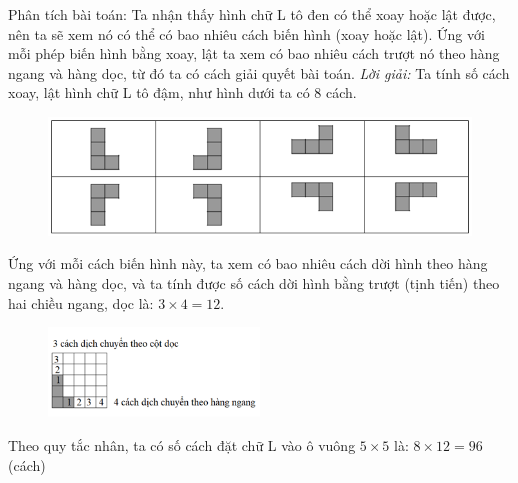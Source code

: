 \begin{multicols}{2}
\begin{multicols}{2}
\begin{figure}[H]
			\vspace*{-5pt}
		\end{figure}
	\end{multicols}
	Phân tích bài toán: Ta nhận thấy hình chữ L tô đen có thể xoay hoặc lật được, nên ta sẽ xem nó có thể có bao nhiêu cách biến hình (xoay hoặc lật).  Ứng với mỗi phép biến hình bằng xoay, lật ta xem có bao nhiêu cách trượt nó theo hàng ngang và hàng dọc, từ đó ta có cách giải quyết bài toán.
	\vskip 0.1cm
	\textit{Lời giải:}
	\vskip 0.1cm
	Ta tính số cách xoay, lật hình chữ L tô đậm, như hình dưới ta có $8$ cách.
	\begin{figure}[H]
		\centering
		\vspace*{-5pt}
		\captionsetup{labelformat=empty, justification=centering}
		\includegraphics[width=1\textwidth]{_14}
		\vspace*{-15pt}
	\end{figure}
	Ứng với mỗi cách biến hình này, ta xem có bao nhiêu cách dời hình theo hàng ngang và hàng dọc, và ta tính được số cách dời hình bằng trượt (tịnh tiến) theo hai chiều ngang, dọc là: $3\times4=12$.
	\begin{multicols}{2}
		\begin{figure}[H]
			\centering
			\vspace*{-5pt}
			\captionsetup{labelformat=empty, justification=centering}
			\includegraphics[width=0.5\textwidth]{_15}
			\vspace*{-15pt}
		\end{figure}
		Theo quy tắc nhân, ta có số cách đặt chữ L vào ô vuông $5\times 5$ là: $8\times12=96$ (cách)

\end{multicols}
\end{multicols}
